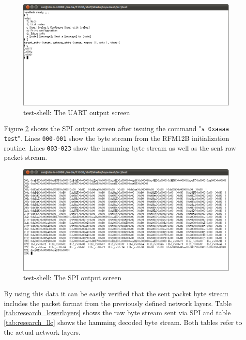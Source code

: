 \begin{figure}[H]
\centering
\includegraphics[width=\textwidth]{figures/research-shell1.png}
\caption{test-shell: The UART output screen}
\label{fig:test-shell1}
\end{figure}

Figure \ref{fig:test-shell2} shows the SPI output screen after issuing the command "\texttt{s 0xaaaa test}". Lines \texttt{000-001} show the byte stream from the RFM12B initialization routine. Lines \texttt{003-023} show the hamming byte stream as well as the sent raw packet stream.

\begin{figure}[H]
\centering
\includegraphics[width=\textwidth]{figures/research-shell2.png}
\caption{test-shell: The SPI output screen}
\label{fig:test-shell2}
\end{figure}

By using this data it can be easily verified that the sent packet byte stream includes the packet format from the previously defined network layers. Table \ref{tab:research_lowerlayers} shows the raw byte stream sent via SPI and table \ref{tab:research_llc} shows the hamming decoded byte stream. Both tables refer to the actual network layers.

